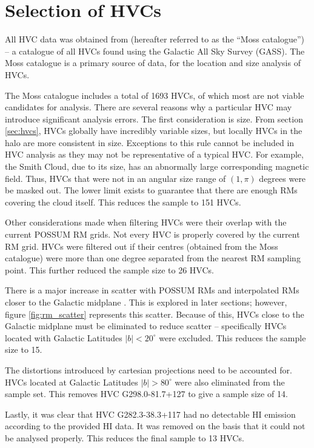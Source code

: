 \section{Selection of HVCs}
\label{sec:hvc_sel}

All HVC data was obtained from \cite{ID3} (hereafter referred to as the “Moss catalogue”) – a catalogue of all HVCs found using the Galactic All Sky Survey (GASS). The Moss catalogue is a primary source of data, for the location and size analysis of HVCs.


The Moss catalogue includes a total of 1693 HVCs, of which most are not viable candidates for analysis. There are several reasons why a particular HVC may introduce significant analysis errors. The first consideration is size. From section \ref{sec:hvcs}, HVCs globally have incredibly variable sizes, but locally HVCs in the halo are more consistent in size. Exceptions to this rule cannot be included in HVC analysis as they may not be representative of a typical HVC. For example, the Smith Cloud, due to its size, has an abnormally large corresponding magnetic field. Thus, HVCs that were not in an angular size range of $(1,\pi)$ degrees were be masked out. The lower limit exists to guarantee that there are enough RMs covering the cloud itself. This reduces the sample to 151 HVCs.


Other considerations made when filtering HVCs were their overlap with the current POSSUM RM grids. Not every HVC is properly covered by the current RM grid. HVCs were filtered out if their centres (obtained from the Moss catalogue) were more than one degree separated from the nearest RM sampling point. This further reduced the sample size to 26 HVCs.


There is a major increase in scatter with POSSUM RMs and interpolated RMs closer to the Galactic midplane \citep{ID21}. This is explored in later sections; however, figure \ref{fig:rm_scatter} represents this scatter. Because of this, HVCs close to the Galactic midplane must be eliminated to reduce scatter – specifically HVCs located with Galactic Latitudes $|b|<20^{\circ}$ were excluded. This reduces the sample size to 15.


The distortions introduced by cartesian projections need to be accounted for. HVCs located at Galactic Latitudes $|b|>80^{\circ}$ were also eliminated from the sample set. This removes HVC G298.0-81.7+127 to give a sample size of 14.

Lastly, it was clear that HVC G282.3-38.3+117 had no detectable HI emission according to the provided HI data. It was removed on the basis that it could not be analysed properly. This reduces the final sample to 13 HVCs.

